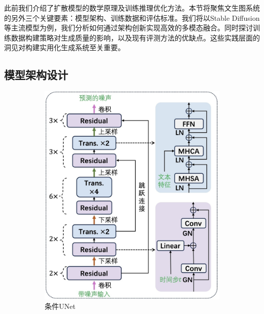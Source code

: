 \documentclass[11pt,a4paper,UTF8]{ctexart}
\begin{document}
此前我们介绍了扩散模型的数学原理及训练推理优化方法。本节将聚焦文生图系统的另外三个关键要素：模型架构、训练数据和评估标准。我们将以Stable Diffusion等主流模型为例，我们分析如何通过架构创新实现高效的多模态融合。同时探讨训练数据构建策略对生成质量的影响，以及现有评测方法的优缺点。这些实践层面的洞见对构建实用化生成系统至关重要。

\subsection{模型架构设计}

\begin{figure}[htbp]
    \centering
    \begin{subfigure}[b]{0.46\textwidth}
        \centering
        \includegraphics[width=\linewidth]{img/C-UNet.jpg}
        \caption{条件UNet}
        \label{fig:c-unet}
    \end{subfigure}
    \hfill
    \begin{subfigure}[b]{0.52\textwidth}
        \centering

\end{subfigure}
\end{figure}
\end{document}
